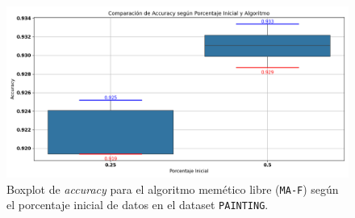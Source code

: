 \begin{figure}[htp]
    \centering
    \includegraphics[width=1\textwidth]{imagenes/evaluaciones/painting/comparacion-por-porcentaje-mem-f}
    \caption{Boxplot de \textit{accuracy} para el algoritmo memético libre (\texttt{MA-F}) según el porcentaje inicial de datos en el dataset \texttt{PAINTING}.}
    \label{fig:comparacion-por-porcentaje-mem-f}
\end{figure}

